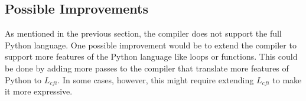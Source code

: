 \subsection{Possible Improvements}
As mentioned in the previous section, the compiler does not support the full Python language. One possible improvement would be to extend the compiler to support more features of the Python language like loops or functions. This could be done by adding more passes to the compiler that translate more features of Python to $L_{cfi}$. In some cases, however, this might require extending $L_{cfi}$ to make it more expressive.
